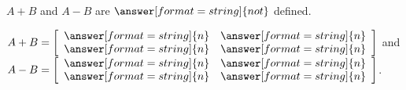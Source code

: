 \documentclass{ximera}
\begin{document}
\begin{exercise}
\begin{enumerate}
    $A+B$ and $A-B$ are $\answer[format=string]{not}$ defined.

    $A + B = \startmat{rr}
      \answer[format=string]{n} & \answer[format=string]{n} \\
      \answer[format=string]{n} & \answer[format=string]{n}
    \stopmat$
    and $A - B = \startmat{rr}
      \answer[format=string]{n} & \answer[format=string]{n} \\
      \answer[format=string]{n} & \answer[format=string]{n}
    \stopmat$.

  \end{enumerate}

\end{exercise}
\end{document}
